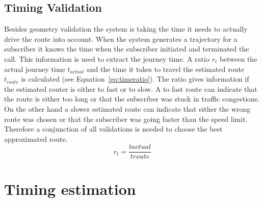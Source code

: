 \subsection{Timing Validation}
Besides geometry validation the system is taking the time it needs to actually drive the route into account. When the system generates a trajectory for a subscriber it knows the time when the subscriber initiated and terminated the call. This information is used to extract the journey time. A ratio $r_t$ between the actual journey time $t_{actual}$ and the time it takes to travel the estimated route $t_{route}$ is calculated (see Equation~\ref{eq:timeratio}). The ratio gives information if the estimated router is either to fast or to slow. A to fast route can indicate that the route is either too long or that the subscriber was stuck in traffic congestions. On the other hand a slower estimated route can indicate that either the wrong route was chosen or that the subscriber was going faster than the speed limit. Therefore a conjunction of all validations is needed to choose the best approximated route.
\begin{equation}
	r_{t}=\frac{t{actual}}{t{route}}
	\label{eq:timeratio}
\end{equation} 
\section{Timing estimation}
\label{sec:timing-estimation}